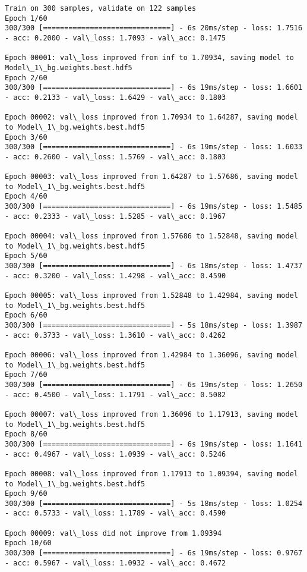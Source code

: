 \documentclass[11pt]{article}
\begin{document}
    \begin{Verbatim}[commandchars=\\\{\}]
Train on 300 samples, validate on 122 samples
Epoch 1/60
300/300 [==============================] - 6s 20ms/step - loss: 1.7516 - acc: 0.2000 - val\_loss: 1.7093 - val\_acc: 0.1475

Epoch 00001: val\_loss improved from inf to 1.70934, saving model to Model\_1\_bg.weights.best.hdf5
Epoch 2/60
300/300 [==============================] - 6s 19ms/step - loss: 1.6601 - acc: 0.2133 - val\_loss: 1.6429 - val\_acc: 0.1803

Epoch 00002: val\_loss improved from 1.70934 to 1.64287, saving model to Model\_1\_bg.weights.best.hdf5
Epoch 3/60
300/300 [==============================] - 6s 19ms/step - loss: 1.6033 - acc: 0.2600 - val\_loss: 1.5769 - val\_acc: 0.1803

Epoch 00003: val\_loss improved from 1.64287 to 1.57686, saving model to Model\_1\_bg.weights.best.hdf5
Epoch 4/60
300/300 [==============================] - 6s 19ms/step - loss: 1.5485 - acc: 0.2333 - val\_loss: 1.5285 - val\_acc: 0.1967

Epoch 00004: val\_loss improved from 1.57686 to 1.52848, saving model to Model\_1\_bg.weights.best.hdf5
Epoch 5/60
300/300 [==============================] - 6s 18ms/step - loss: 1.4737 - acc: 0.3200 - val\_loss: 1.4298 - val\_acc: 0.4590

Epoch 00005: val\_loss improved from 1.52848 to 1.42984, saving model to Model\_1\_bg.weights.best.hdf5
Epoch 6/60
300/300 [==============================] - 5s 18ms/step - loss: 1.3987 - acc: 0.3733 - val\_loss: 1.3610 - val\_acc: 0.4262

Epoch 00006: val\_loss improved from 1.42984 to 1.36096, saving model to Model\_1\_bg.weights.best.hdf5
Epoch 7/60
300/300 [==============================] - 6s 19ms/step - loss: 1.2650 - acc: 0.4500 - val\_loss: 1.1791 - val\_acc: 0.5082

Epoch 00007: val\_loss improved from 1.36096 to 1.17913, saving model to Model\_1\_bg.weights.best.hdf5
Epoch 8/60
300/300 [==============================] - 6s 19ms/step - loss: 1.1641 - acc: 0.4967 - val\_loss: 1.0939 - val\_acc: 0.5246

Epoch 00008: val\_loss improved from 1.17913 to 1.09394, saving model to Model\_1\_bg.weights.best.hdf5
Epoch 9/60
300/300 [==============================] - 5s 18ms/step - loss: 1.0254 - acc: 0.5733 - val\_loss: 1.1789 - val\_acc: 0.4590

Epoch 00009: val\_loss did not improve from 1.09394
Epoch 10/60
300/300 [==============================] - 6s 19ms/step - loss: 0.9767 - acc: 0.5967 - val\_loss: 1.0932 - val\_acc: 0.4672


\end{Verbatim}
\end{document}
